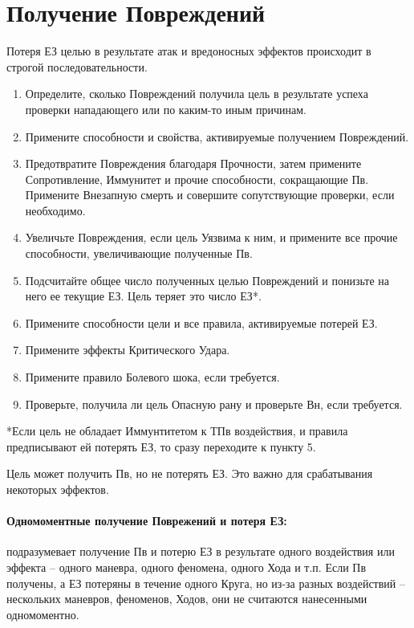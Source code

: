 \section{Получение Повреждений}
Потеря ЕЗ целью в результате атак и вредоносных эффектов происходит в строгой последовательности.
\begin{enumerate}
  \item Определите, сколько Повреждений получила цель в результате успеха проверки нападающего или по каким-то иным причинам.
  \item Примените способности и свойства, активируемые получением Повреждений.
  \item Предотвратите Повреждения благодаря Прочности, затем примените Сопротивление, Иммунитет и прочие способности, сокращающие Пв. Примените Внезапную смерть и совершите сопутствующие проверки, если необходимо.
  \item Увеличьте Повреждения, если цель Уязвима к ним, и примените все прочие способности, увеличивающие полученные Пв.
  \item Подсчитайте общее число полученных целью Повреждений и понизьте на него ее текущие ЕЗ. Цель теряет это число ЕЗ*.
  \item Примените способности цели и все правила, активируемые потерей ЕЗ.
  \item Примените эффекты Критического Удара.
  \item Примените правило Болевого шока, если требуется.
  \item Проверьте, получила ли цель Опасную рану и проверьте Вн, если требуется.
\end{enumerate}
*Если цель не обладает Иммунтитетом к ТПв воздействия, и правила предписывают ей потерять ЕЗ, то сразу переходите к пункту 5. 
\begin{tcolorbox}
  Цель может получить Пв, но не потерять ЕЗ. Это важно для срабатывания некоторых эффектов.
\end{tcolorbox}

\paragraph{Одномоментные получение Поврежений и потеря ЕЗ:} подразумевает получение Пв и потерю ЕЗ в результате одного воздействия или эффекта – одного маневра, одного феномена, одного Хода и т.п. Если Пв получены, а ЕЗ потеряны в течение одного Круга, но из-за разных воздействий – нескольких маневров, феноменов, Ходов, они не считаются нанесенными одномоментно.

